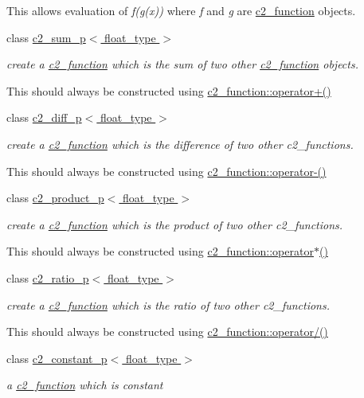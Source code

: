 \begin{DoxyCompactItemize}
\begin{DoxyCompactList}
This allows evaluation of {\itshape f(g(x))} where {\itshape f} and {\itshape g} are \hyperlink{classc2__function}{c2\-\_\-function} objects. \end{DoxyCompactList}\item 
class \hyperlink{classc2__sum__p}{c2\-\_\-sum\-\_\-p$<$ float\-\_\-type $>$}
\begin{DoxyCompactList}\small\item\em create a \hyperlink{classc2__function}{c2\-\_\-function} which is the sum of two other \hyperlink{classc2__function}{c2\-\_\-function} objects.

This should always be constructed using \hyperlink{classc2__function_a268b206b47c55e635e5f0a9e0f3e8ded}{c2\-\_\-function\-::operator+()} \end{DoxyCompactList}\item 
class \hyperlink{classc2__diff__p}{c2\-\_\-diff\-\_\-p$<$ float\-\_\-type $>$}
\begin{DoxyCompactList}\small\item\em create a \hyperlink{classc2__function}{c2\-\_\-function} which is the difference of two other c2\-\_\-functions.

This should always be constructed using \hyperlink{classc2__function_a4c56a4673e00bfad37143c403a0c94c8}{c2\-\_\-function\-::operator-\/()} \end{DoxyCompactList}\item 
class \hyperlink{classc2__product__p}{c2\-\_\-product\-\_\-p$<$ float\-\_\-type $>$}
\begin{DoxyCompactList}\small\item\em create a \hyperlink{classc2__function}{c2\-\_\-function} which is the product of two other c2\-\_\-functions.

This should always be constructed using \hyperlink{classc2__function_a7744675c98a8ec63320ac1c0b61bec9c}{c2\-\_\-function\-::operator$\ast$()} \end{DoxyCompactList}\item 
class \hyperlink{classc2__ratio__p}{c2\-\_\-ratio\-\_\-p$<$ float\-\_\-type $>$}
\begin{DoxyCompactList}\small\item\em create a \hyperlink{classc2__function}{c2\-\_\-function} which is the ratio of two other c2\-\_\-functions.

This should always be constructed using \hyperlink{classc2__function_a93ac28dfe5daebea84d147b8e346e60c}{c2\-\_\-function\-::operator/()} \end{DoxyCompactList}\item 
class \hyperlink{classc2__constant__p}{c2\-\_\-constant\-\_\-p$<$ float\-\_\-type $>$}
\begin{DoxyCompactList}\small\item\em a \hyperlink{classc2__function}{c2\-\_\-function} which is constant


\end{DoxyCompactList}
\end{DoxyCompactItemize}
